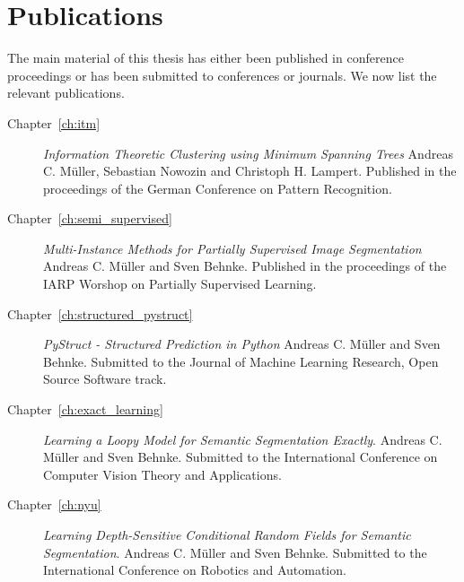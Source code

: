 \section{Publications}
The main material of this thesis has either been published in conference
proceedings or has been submitted to conferences or journals. We now list the
relevant publications.
\begin{description}
    \item[Chapter~\ref{ch:itm}] \emph{Information Theoretic Clustering using
        Minimum Spanning Trees} Andreas C. M\"uller, Sebastian Nowozin and
        Christoph H. Lampert. Published in the proceedings of the German
        Conference on Pattern Recognition.
    \item[Chapter~\ref{ch:semi_supervised}] \emph{Multi-Instance Methods for
        Partially Supervised Image Segmentation} Andreas C. M\"uller and Sven
        Behnke. Published in the proceedings of the IARP Worshop on Partially
        Supervised Learning.
    \item[Chapter~\ref{ch:structured_pystruct}] \emph{PyStruct - Structured
        Prediction in Python} Andreas C. M\"uller and Sven Behnke. Submitted to
        the Journal of Machine Learning Research, Open Source Software track.
    \item[Chapter~\ref{ch:exact_learning}] \emph{Learning a Loopy Model for
        Semantic Segmentation Exactly}. Andreas C. M\"uller and Sven Behnke.
        Submitted to the International Conference on Computer Vision Theory and
        Applications.
    \item[Chapter~\ref{ch:nyu}] \emph{Learning Depth-Sensitive Conditional
        Random Fields for Semantic Segmentation}. Andreas C. M\"uller and Sven
        Behnke. Submitted to the International Conference on Robotics and
        Automation.
\end{description}
